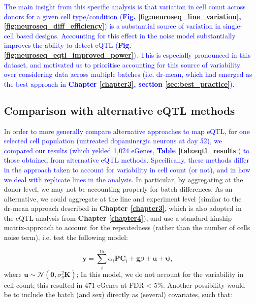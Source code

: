 \newpage

\textcolor{blue}{The main insight from this specific analysis is that variation in cell count across donors for a given cell type/condition (\textbf{Fig. \ref{fig:neuroseq_line_variation},\ref{fig:neuroseq_diff_efficiency}}) is a substantial source of variation in single-cell based designs. 
Accounting for this effect in the noise model substantially improves the ability to detect eQTL (\textbf{Fig. \ref{fig:neuroseq_eqtl_improved_power}}).
This is especially pronounced in this dataset, and motivated us to prioritise accounting for this source of variability over considering data across multiple batches (i.e. dr-mean, which had emerged as the best approach in \textbf{Chapter \ref{chapter3}, section \ref{sec:best_practice}}).}


\subsection{Comparison with alternative eQTL methods}
\label{sec:neuroseq_eqtl_methods}

\textcolor{blue}{In order to more generally compare alternative approaches to map eQTL, for one selected cell population (untreated dopaminergic neurons at day 52), we compared our results (which yelded 1,024 eGenes, \textbf{Table \ref{tab:eqtl_results}}) to those obtained from alternative eQTL methods.
Specifically, these methods differ in the approach taken to account for variability in cell count (or not), and in how we deal with replicate lines in the analysis. }
In particular, by aggregating at the donor level, we may not be accounting properly for batch differences.
As an alternative, we could aggregate at the line and experiment level (similar to the dr-mean approach described in \textbf{Chapter \ref{chapter3}}, which is also adopted in the eQTL analysis from \textbf{Chapter \ref{chapter4}}), and use a standard kinship matrix-approach to account for the repeatedness (rather than the number of cells noise term), i.e. test the following model:

\begin{equation}\label{eq:neuroseq_pcs_kinship}
    \mathbf{y} = \sum_i^{15}\alpha_i \mathbf{PC}_i + \mathbf{g}\beta + \mathbf{u} + \boldsymbol{\psi}, 
\end{equation}
where $ \mathbf{u} \sim \mathcal{N}(\mathbf{0},\sigma_g^2\mathbf{K})$;
In this model, we do not account for the variability in cell count; this resulted in 471 eGenes at FDR < 5\%.
Another possibility would be to include the batch (and sex) directly as (several) covariates, such that:


